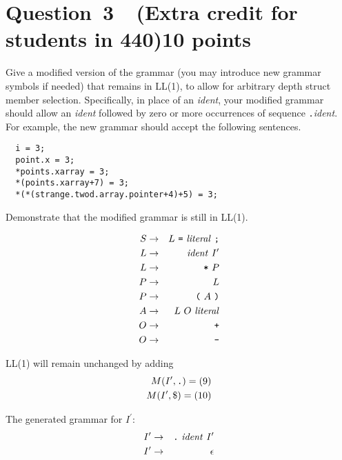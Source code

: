 \documentclass[10pt]{article}
\begin{document}
\section*{Question~3~~(Extra credit for students in 440)\hfill 10 points}

Give a modified version of the grammar
(you may introduce new grammar symbols if needed)
that remains in LL(1),
to allow for arbitrary depth struct member selection.
Specifically,
in place of an \emph{ident},
your modified grammar should allow
an \emph{ident} followed by zero or more
occurrences of sequence \verb|.|\emph{ident}.
For example, the new grammar should accept
the following sentences.
\begin{verbatim}
  i = 3;
  point.x = 3;
  *points.xarray = 3;
  *(points.xarray+7) = 3;
  *(*(strange.twod.array.pointer+4)+5) = 3;
\end{verbatim}
Demonstrate that the modified grammar is still in LL(1).
\begin{framed}
\begin{eqnarray*}
    S & \rightarrow & L ~ \verb|=| ~ \mathit{literal} ~ \verb|;| \\
    L & \rightarrow & \mathit{ident} ~ I^{\prime} \\
    L & \rightarrow & \verb|*| ~ P \\
    P & \rightarrow & L \\
    P & \rightarrow & \verb|(| ~ A ~ \verb|)| \\
    A & \rightarrow & L ~ O ~ \mathit{literal} \\
    O & \rightarrow & \verb|+| \\
    O & \rightarrow & \verb|-|
\end{eqnarray*}

LL(1) will remain unchanged by adding
\begin{eqnarray*}
M(I^\prime, \verb|.|) = (9) \\
M(I^\prime, \$) = (10)
\end{eqnarray*}


The generated grammar for $I^{\prime}$:
\begin{eqnarray*}
    I^{\prime} & \rightarrow & \verb|.| ~ \mathit{ident} ~ I^{\prime} \\
    I^{\prime} & \rightarrow & \epsilon
\end{eqnarray*}

\end{framed}
\end{document}

